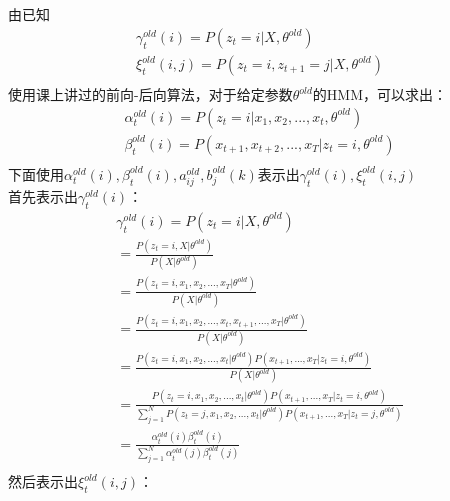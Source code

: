 \documentclass[12pt,a4paper]{article}
\begin{document}
\subsection{}
由已知
\begin{gather*}
    \gamma_{t}^{old}(i) = P(z_t = i|X,\theta^{old})\\
    \xi_{t}^{old}(i,j) = P(z_t = i,z_{t+1} = j|X,\theta^{old})\\
\end{gather*}
使用课上讲过的前向-后向算法，对于给定参数$\theta^{old}$的HMM，可以求出：
\begin{gather*}
    \alpha_{t}^{old}(i) = P(z_t = i|x_1,x_2,...,x_t,\theta^{old})\\
    \beta_{t}^{old}(i) = P(x_{t+1},x_{t+2},...,x_T|z_t = i,\theta^{old})\\
\end{gather*}
下面使用$\alpha_t^{old}(i),\beta_t^{old}(i),a_{ij}^{old},b_j^{old}{(k)}$表示出$\gamma_{t}^{old}(i),\xi_{t}^{old}(i,j)$\\
首先表示出$\gamma_{t}^{old}(i)$：\\
\begin{gather*}
    \gamma_{t}^{old}(i) = P(z_t = i|X,\theta^{old})\\
    = \frac{P(z_t = i,X|\theta^{old})}{P(X|\theta^{old})}\\
    = \frac{P(z_t = i,x_1,x_2,...,x_T|\theta^{old})}{P(X|\theta^{old})}\\
    = \frac{P(z_t = i,x_1,x_2,...,x_t,x_{t+1},...,x_T|\theta^{old})}{P(X|\theta^{old})}\\
    = \frac{P(z_t = i,x_1,x_2,...,x_t|\theta^{old})P(x_{t+1},...,x_T|z_t = i,\theta^{old})}{P(X|\theta^{old})}\\
    = \frac{P(z_t = i,x_1,x_2,...,x_t|\theta^{old})P(x_{t+1},...,x_T|z_t = i,\theta^{old})}{\sum_{j=1}^{N}P(z_t = j,x_1,x_2,...,x_t|\theta^{old})P(x_{t+1},...,x_T|z_t = j,\theta^{old})}\\
    = \frac{\alpha_{t}^{old}(i)\beta_{t}^{old}(i)}{\sum_{j=1}^{N}\alpha_{t}^{old}(j)\beta_{t}^{old}(j)}\\
\end{gather*}
然后表示出$\xi_{t}^{old}(i,j)$：\\
\end{document}
